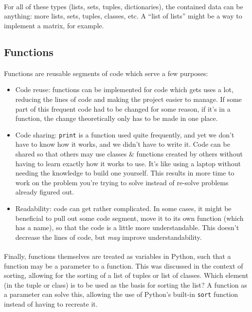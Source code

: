 \documentclass[letter,10pt]{article}
\begin{document}
\paragraph{}For all of these types (lists, sets, tuples, dictionaries), the contained data can be anything: more lists, sets, tuples, classes, etc. A ``list of lists'' might be a way to implement a matrix, for example.

\subsection{Functions}
\paragraph{}Functions are reusable segments of code which serve a few purposes:
\begin{itemize}
    \item Code reuse: functions can be implemented for code which gets uses a lot, reducing the lines of code and making the project easier to manage. If some part of this frequent code had to be changed for some reason, if it's in a function, the change theoretically only has to be made in one place.
    \item Code sharing: \verb|print| is a function used quite frequently, and yet we don't have to know how it works, and we didn't have to write it. Code can be shared so that others may use classes \& functions created by others without having to learn exactly how it works to use. It's like using a laptop without needing the knowledge to build one yourself. This results in more time to work on the problem you're trying to solve instead of re-solve problems already figured out.
    \item Readability: code can get rather complicated. In some cases, it might be beneficial to pull out some code segment, move it to its own function (which has a name), so that the code is a little more understandable. This doesn't decrease the lines of code, but \textit{may} improve understandability.
\end{itemize}

\paragraph{}Finally, functions themselves are treated as variables in Python, such that a function may be a parameter to a function. This was discussed in the context of sorting, allowing for the sorting of a list of tuples or list of classes. Which element (in the tuple or class) is to be used as the basis for sorting the list? A function as a parameter can solve this, allowing the use of Python's built-in \verb|sort| function instead of having to recreate it.
\end{document}

